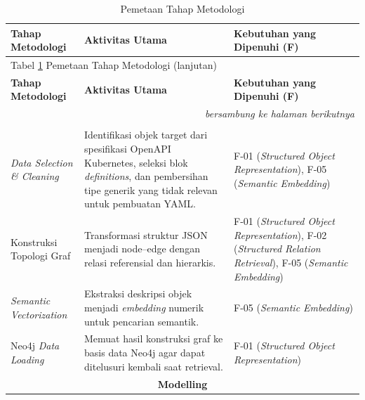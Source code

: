 \renewcommand{\arraystretch}{1.35}
\captionsetup[longtable]{justification=raggedright,singlelinecheck=false}

\begin{longtable}{ p{3.8cm} p{5cm} p{4cm} }
\caption{Pemetaan Tahap Metodologi}
\label{tbl:mapping_methodology_requirements} \\
\hline
\textbf{Tahap Metodologi} &
\textbf{Aktivitas Utama} &
\textbf{Kebutuhan yang Dipenuhi (F)} \\
\hline
\endfirsthead

\multicolumn{3}{l}{Tabel \ref{tbl:mapping_methodology_requirements} Pemetaan Tahap Metodologi (lanjutan)} \\
\hline
\textbf{Tahap Metodologi} &
\textbf{Aktivitas Utama} &
\textbf{Kebutuhan yang Dipenuhi (F)} \\
\hline
\endhead

\hline
\multicolumn{3}{r}{\textit{bersambung ke halaman berikutnya}} \\
\endfoot

\hline
\endlastfoot

\multicolumn{3}{c}{\textbf{Data Preparation}} \\ \hline

\textit{Data Selection \& Cleaning} &
Identifikasi objek target dari spesifikasi OpenAPI Kubernetes, seleksi blok \textit{definitions}, dan pembersihan tipe generik yang tidak relevan untuk pembuatan YAML. &
F-01 (\textit{Structured Object Representation}),
F-05 (\textit{Semantic Embedding}) \\ \hline

Konstruksi Topologi Graf &
Transformasi struktur JSON menjadi node–edge dengan relasi referensial dan hierarkis. &
F-01 (\textit{Structured Object Representation}),
F-02 (\textit{Structured Relation Retrieval}),
F-05 (\textit{Semantic Embedding}) \\ \hline

\textit{Semantic Vectorization} &
Ekstraksi deskripsi objek menjadi \textit{embedding} numerik untuk pencarian semantik. &
F-05 (\textit{Semantic Embedding}) \\ \hline

Neo4j \textit{Data Loading} &
Memuat hasil konstruksi graf ke basis data Neo4j agar dapat ditelusuri kembali saat retrieval. &
F-01 (\textit{Structured Object Representation}) \\ \hline


\multicolumn{3}{c}{\textbf{Modelling}} \\ \hline


\end{longtable}
